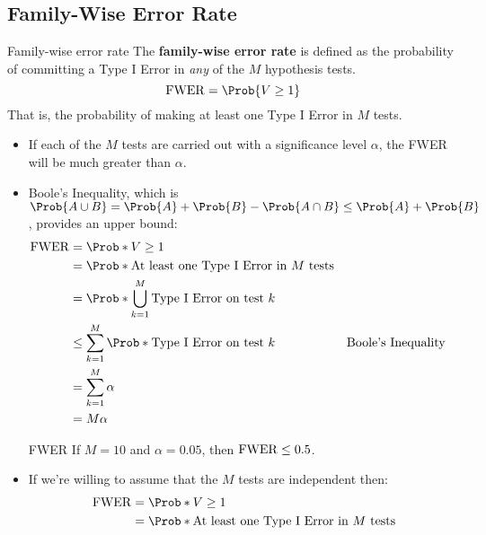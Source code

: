 \subsection{Family-Wise Error Rate}
\begin{Definition}{Family-wise error rate}{}
      The \textbf{family-wise error rate} is defined as the probability of committing a Type I Error in \emph{any} of the
      $M$ hypothesis tests.
      \[ \FWER=\Prob{V\ge 1} \]
      That is, the probability of making at least one Type I Error in $ M $ tests.
\end{Definition}
\begin{itemize}
      \item If each of the $M$ tests are carried out with a significance level $ \alpha $, the FWER will be much greater
            than $ \alpha $.
      \item Boole's Inequality, which is $ \Prob{A\cup B}=\Prob{A}+\Prob{B}-\Prob{A\cap B}\le \Prob{A}+\Prob{B} $, provides an upper bound:
            \begin{align*}
                  \FWER
                   & =\Prob*{V\ge 1}                                                                             \\
                   & =\Prob*{\text{At least one Type I Error in $ M $ tests}}                                    \\
                   & =\Prob*{\bigcup_{k=1}^M \text{Type I Error on test $ k $}}                                  \\
                   & \le \sum_{k=1}^{M} \Prob*{\text{Type I Error on test $ k $}} &  & \text{Boole's Inequality} \\
                   & =\sum_{k=1}^{M} \alpha                                                                      \\
                   & =M\alpha
            \end{align*}
            \begin{Example}{FWER}{}
                  If $ M=10 $ and $ \alpha=0.05 $, then $ \operatorname{FWER}\le 0.5 $.
            \end{Example}
      \item If we're willing to assume that the $M$ tests are independent then:
            \begin{align*}
                  \FWER
                   & =\Prob*{V\ge 1}                                                                            \\
                   & =\Prob*{\text{At least one Type I Error in $ M $ tests}}                                   \\

\end{align*}
\end{itemize}
